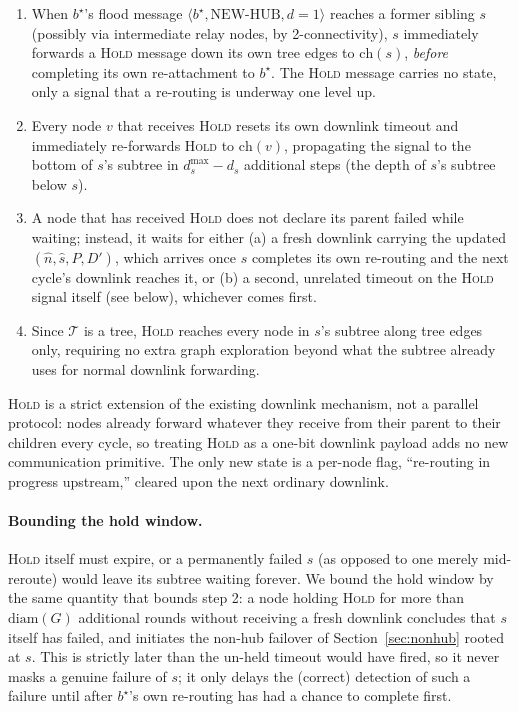 \documentclass{article}
\begin{document}
\begin{enumerate}
    \item When $b^\star$'s flood message $\langle b^\star, \text{NEW-HUB}, d{=}1\rangle$
        reaches a former sibling $s$ (possibly via intermediate relay nodes, by
        2-connectivity), $s$ immediately forwards a \textsc{Hold} message down its own
        tree edges to $\mathrm{ch}(s)$, \emph{before} completing its own re-attachment
        to $b^\star$. The \textsc{Hold} message carries no state, only a signal that a
        re-routing is underway one level up.
    \item Every node $v$ that receives \textsc{Hold} resets its own downlink timeout and
        immediately re-forwards \textsc{Hold} to $\mathrm{ch}(v)$, propagating the signal
        to the bottom of $s$'s subtree in $d_s^{\max} - d_s$ additional steps (the depth
        of $s$'s subtree below $s$).
    \item A node that has received \textsc{Hold} does not declare its parent failed
        while waiting; instead, it waits for either (a) a fresh downlink carrying the
        updated $(\hat n, \hat s, P, D')$, which arrives once $s$ completes its own
        re-routing and the next cycle's downlink reaches it, or (b) a second, unrelated
        timeout on the \textsc{Hold} signal itself (see below), whichever comes first.
    \item Since $\mathcal{T}$ is a tree, \textsc{Hold} reaches every node in $s$'s
        subtree along tree edges only, requiring no extra graph exploration beyond what
        the subtree already uses for normal downlink forwarding.
\end{enumerate}

\textsc{Hold} is a strict extension of the existing downlink mechanism, not a parallel
protocol: nodes already forward whatever they receive from their parent to their
children every cycle, so treating \textsc{Hold} as a one-bit downlink payload adds no
new communication primitive. The only new state is a per-node flag, ``re-routing in
progress upstream,'' cleared upon the next ordinary downlink.

\paragraph{Bounding the hold window.} \textsc{Hold} itself must expire, or a
permanently failed $s$ (as opposed to one merely mid-reroute) would leave its subtree
waiting forever. We bound the hold window by the same quantity that bounds step 2: a
node holding \textsc{Hold} for more than $\mathrm{diam}(G)$ additional rounds without
receiving a fresh downlink concludes that $s$ itself has failed, and initiates the
non-hub failover of Section~\ref{sec:nonhub} rooted at $s$. This is strictly later
than the un-held timeout would have fired, so it never masks a genuine failure of $s$;
it only delays the (correct) detection of such a failure until after $b^\star$'s own
re-routing has had a chance to complete first.
\end{document}
